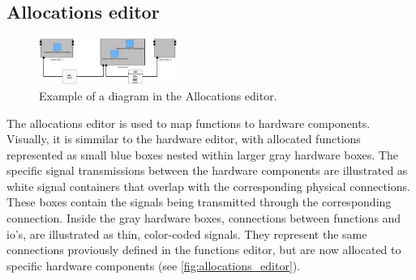 \subsection{Allocations editor}
\label{sec:allocations_editor}
\begin{figure}[h]
    \centering
    \includegraphics[width=0.4\textwidth]{pictures/allocations_editor.png}
    \caption[Example of a diagram in the Allocations editor]{Example of a diagram in the Allocations editor.}
    \label{fig:allocations_editor}
\end{figure}
The allocations editor is used to map functions to hardware components. Visually, it is simmilar to the hardware editor, with allocated functions represented as small blue boxes nested within larger gray hardware boxes. The specific signal transmissions between the hardware components are illustrated as white signal containers that overlap with the corresponding physical connections. These boxes contain the signals being transmitted through the corresponding connection. Inside the gray hardware boxes, connections between functions and \acrshort{io}'s, are illustrated as thin, color-coded signals. They represent the same connections proviously defined in the functions editor, but are now allocated to specific hardware components (see \autoref{fig:allocations_editor}).

